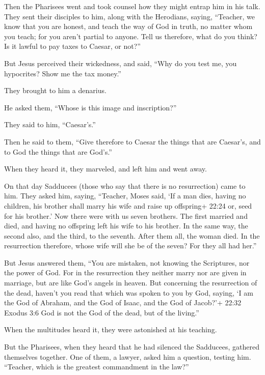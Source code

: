  Then the Pharisees went and took counsel how they might
entrap him in his talk.  They sent their disciples to him,
along with the Herodians, saying, ``Teacher, we know that you are
honest, and teach the way of God in truth, no matter whom you teach; for
you aren't partial to anyone.  Tell us therefore, what do
you think? Is it lawful to pay taxes to Caesar, or not?''

 But Jesus perceived their wickedness, and said, ``Why do
you test me, you hypocrites?  Show me the tax money.''

They brought to him a denarius.

 He asked them, ``Whose is this image and inscription?''

 They said to him, ``Caesar's.''

Then he said to them, ``Give therefore to Caesar the things that are
Caesar's, and to God the things that are God's.''

 When they heard it, they marveled, and left him and went
away.

 On that day Sadducees (those who say that there is no
resurrection) came to him. They asked him,  saying,
``Teacher, Moses said, `If a man dies, having no children, his brother
shall marry his wife and raise up offspring+ 22:24 or, seed for his
brother.'  Now there were with us seven brothers. The first
married and died, and having no offspring left his wife to his brother.
 In the same way, the second also, and the third, to the
seventh.  After them all, the woman died.  In
the resurrection therefore, whose wife will she be of the seven? For
they all had her.''

 But Jesus answered them, ``You are mistaken, not knowing
the Scriptures, nor the power of God.  For in the
resurrection they neither marry nor are given in marriage, but are like
God's angels in heaven.  But concerning the resurrection of
the dead, haven't you read that which was spoken to you by God, saying,
 `I am the God of Abraham, and the God of Isaac, and the
God of Jacob?'+ 22:32 Exodus 3:6 God is not the God of the dead, but of
the living.''

 When the multitudes heard it, they were astonished at his
teaching.

 But the Pharisees, when they heard that he had silenced
the Sadducees, gathered themselves together.  One of them,
a lawyer, asked him a question, testing him.  ``Teacher,
which is the greatest commandment in the law?''

